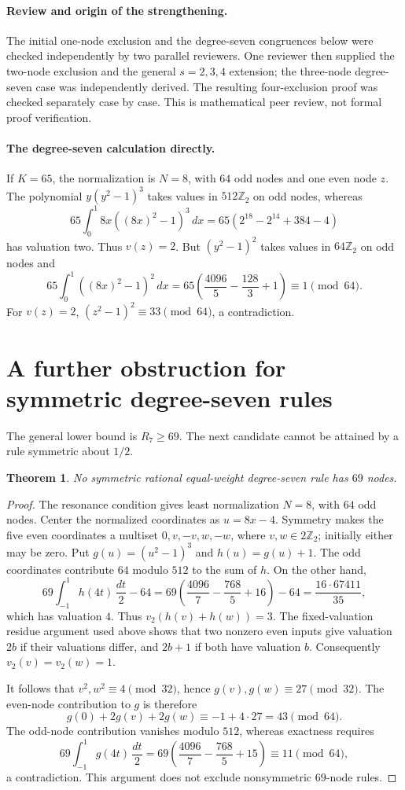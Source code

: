 \documentclass[11pt]{article}
\newtheorem{theorem}{Theorem}
\begin{document}
\paragraph{Review and origin of the strengthening.}
The initial one-node exclusion and the degree-seven congruences below
were checked independently by two parallel reviewers. One reviewer
then supplied the two-node exclusion and the general $s=2,3,4$
extension; the three-node degree-seven case was independently derived.
The resulting four-exclusion proof was checked separately case by case.
This is mathematical peer review, not formal proof verification.

\paragraph{The degree-seven calculation directly.}
If $K=65$, the normalization is $N=8$, with $64$ odd nodes and one
even node $z$. The polynomial $y(y^2-1)^3$ takes values in
$512\mathbb Z_2$ on odd nodes, whereas
\[
 65\int_0^1 8x((8x)^2-1)^3\,dx
 =65(2^{18}-2^{14}+384-4)
\]
has valuation two. Thus $v(z)=2$. But $(y^2-1)^2$ takes values in
$64\mathbb Z_2$ on odd nodes and
\[
 65\int_0^1((8x)^2-1)^2\,dx
 =65\left(\frac{4096}{5}-\frac{128}{3}+1\right)
 \equiv1\pmod{64}.
\]
For $v(z)=2$, $(z^2-1)^2\equiv33\pmod{64}$, a contradiction.

\section*{A further obstruction for symmetric degree-seven rules}
The general lower bound is $R_7\ge69$. The next candidate cannot be
attained by a rule symmetric about $1/2$.
\begin{theorem}
No symmetric rational equal-weight degree-seven rule has $69$ nodes.
\end{theorem}
\begin{proof}
The resonance condition gives least normalization $N=8$, with $64$
odd nodes. Center the normalized coordinates as $u=8x-4$. Symmetry
makes the five even coordinates a multiset $0,v,-v,w,-w$, where
$v,w\in2\mathbb Z_2$; initially either may be zero. Put
$g(u)=(u^2-1)^3$ and $h(u)=g(u)+1$. The odd coordinates contribute
$64$ modulo $512$ to the sum of $h$. On the other hand,
\[
69\int_{-1}^1h(4t)\,\frac{dt}{2}-64
=69\left(\frac{4096}{7}-\frac{768}{5}+16\right)-64
=\frac{16\cdot67411}{35},
\]
which has valuation $4$. Thus $v_2(h(v)+h(w))=3$. The fixed-valuation
residue argument used above shows that two nonzero even inputs give
valuation $2b$ if their valuations differ, and $2b+1$ if both have
valuation $b$. Consequently $v_2(v)=v_2(w)=1$.

It follows that $v^2,w^2\equiv4\pmod{32}$, hence
$g(v),g(w)\equiv27\pmod{32}$. The even-node contribution to $g$ is
therefore
\[
 g(0)+2g(v)+2g(w)\equiv-1+4\cdot27=43\pmod{64}.
\]
The odd-node contribution vanishes modulo $512$, whereas exactness
requires
\[
69\int_{-1}^1g(4t)\,\frac{dt}{2}
=69\left(\frac{4096}{7}-\frac{768}{5}+15\right)
\equiv11\pmod{64},
\]
a contradiction. This argument does not exclude nonsymmetric
$69$-node rules.
\end{proof}
\end{document}

